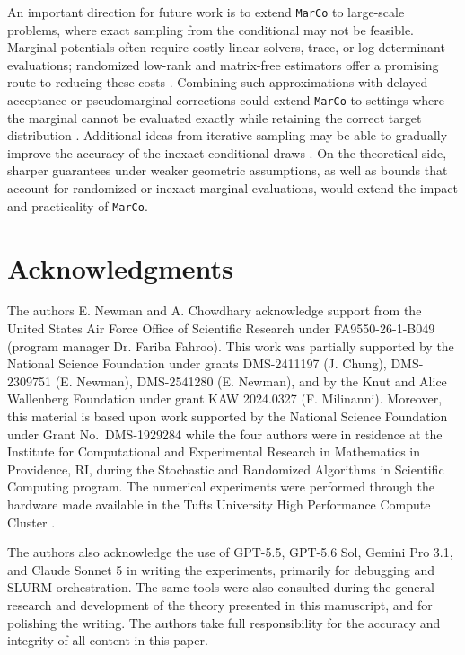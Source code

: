 \documentclass[onefignum,onetabnum]{siamonline250211}
\newcommand{\MarCo}{\textnormal{\texttt{MarCo}}\xspace}
\begin{document}
An important direction for future work is to extend \MarCo to large-scale problems, where exact sampling from the conditional may not be feasible. Marginal potentials often require costly linear solvers, trace, or log-determinant evaluations; randomized low-rank and matrix-free estimators offer a promising route to reducing these costs \cite{saibaba_randomized_2017}. 
Combining such approximations with delayed acceptance or pseudomarginal corrections could extend \MarCo to settings where the marginal cannot be evaluated exactly while retaining the correct target distribution \cite{saibaba_efficient_2019}. 
Additional ideas from iterative sampling may be able to gradually improve the accuracy of the inexact conditional draws \cite{newman_slimtrain---stochastic_2022, chung_sampled_2020, slagel_sampled_2019}. 
On the theoretical side, sharper guarantees under weaker geometric assumptions, as well as bounds that account for randomized or inexact marginal evaluations, would 
%
extend the impact and practicality of \MarCo.
  
\section*{Acknowledgments}
The authors E. Newman and A. Chowdhary acknowledge support from the United States Air Force Office of Scientific Research under FA9550-26-1-B049 (program manager Dr. Fariba Fahroo).
This work was partially supported by the National Science Foundation under grants DMS-2411197 (J. Chung), DMS-2309751 (E. Newman), DMS-2541280 (E. Newman), and by the Knut and Alice Wallenberg Foundation under grant KAW 2024.0327 (F. Milinanni).
Moreover, this material is based upon work supported by the National Science Foundation under Grant No.~DMS-1929284 while the four authors were in residence at the Institute for Computational and Experimental Research in Mathematics in Providence, RI, during the Stochastic and Randomized Algorithms in Scientific Computing program.
The numerical experiments were performed through the hardware made available in the Tufts University High Performance Compute Cluster \cite{phimmasen_reference_2021}.

The authors also acknowledge the use of GPT-5.5, GPT-5.6 Sol, Gemini Pro 3.1, and Claude Sonnet 5 in writing the experiments, primarily for debugging and SLURM orchestration.
The same tools were also consulted during the general research and development of the theory presented in this manuscript, and for polishing the writing.
%
The authors take full responsibility for the accuracy and integrity of all content in this paper.
\end{document}
